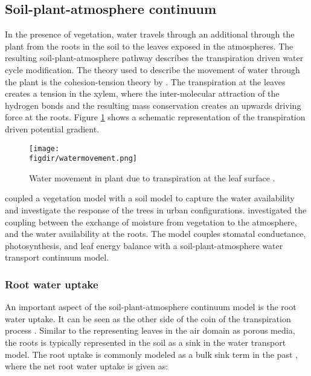 \subsection{Soil-plant-atmosphere continuum}

In the presence of vegetation, water travels through an additional through the plant from the roots in the soil to the leaves exposed in the atmospheres. The resulting soil-plant-atmosphere pathway describes the transpiration driven water cycle modification. The theory used to describe the movement of water through the plant is the cohesion-tension theory by \cite{Dixon1895}. The transpiration at the leaves creates a tension in the xylem, where the inter-molecular attraction of the hydrogen bonds and the resulting mass conservation creates an upwards driving force at the roots. Figure \ref{fig:watermovement} shows a schematic representation of the transpiration driven potential gradient.  

	 \begin{figure}[t]
	 	\centering
	 	\texttt{[image: \\figdir/watermovement.png]}
	 	\caption{Water movement in plant due to transpiration at the leaf surface \citep{Sawinski2011}.}
	 	\label{fig:watermovement}
	 \end{figure}

\cite{Bruse1998} coupled a vegetation model with a soil model to capture the water availability and investigate the response of the trees in urban configurations. \cite{Tuzet2003} investigated the coupling between the exchange of moisture from vegetation to the atmosphere, and the water availability at the roots. The model couples stomatal conductance, photosynthesis, and leaf energy balance with a soil-plant-atmosphere water transport continuum model. 

\subsubsection*{Root water uptake}

An important aspect of the soil-plant-atmosphere continuum model is the root water uptake. It can be seen as the other side of the coin of the transpiration process \citep{Clark2015}. Similar to the representing leaves in the air domain as porous media, the roots is typically represented in the soil as a sink in the water transport model. The root uptake is commonly modeled as a bulk sink term in the past \citep{Hopmans2002,Vrugt2001}, where the net root water uptake is given as:
	 
